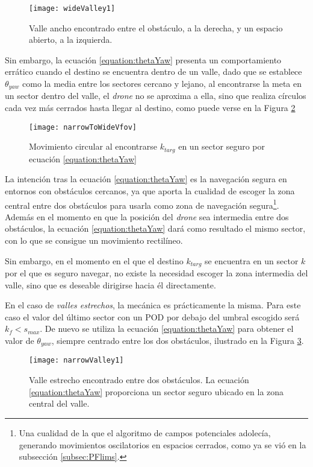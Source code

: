  \begin{figure}
	\centering
	\texttt{[image: wideValley1]}
	\caption[Valles estrechos y anchos.]{Valle ancho encontrado entre el obstáculo, a la derecha, y un espacio abierto, a la izquierda.}\label{fig:wvalley1}
\end{figure}


Sin embargo, la ecuación \ref{equation:thetaYaw} presenta un comportamiento errático cuando el destino se encuentra dentro de un valle, dado que se establece $\theta_{yaw}$ como la media entre los sectores cercano y lejano, al encontrarse la meta en un sector dentro del valle, el \emph{drone} no se aproxima a ella, sino que realiza círculos cada vez más cerrados hasta llegar al destino, como puede verse en la Figura \ref{fig:nToWFOV}

 \begin{figure}
	\centering
	\texttt{[image: narrowToWideVfov]}
	\caption[Movimiento circular del agente.]{Movimiento circular al encontrarse $k_{targ}$ en un sector seguro por ecuación \ref{equation:thetaYaw}}\label{fig:nToWFOV}
\end{figure}

La intención tras la ecuación \ref{equation:thetaYaw} es la navegación segura en entornos con obstáculos cercanos, ya que aporta la cualidad de escoger la zona central entre dos obstáculos para usarla como zona de navegación segura\footnote{Una cualidad de la que el algoritmo de campos potenciales adolecía, generando movimientos oscilatorios en espacios cerrados, como ya se vió en la subsección \ref{subsec:PFlims}.}. Además en el momento en que la posición del \emph{drone} sea intermedia entre dos obstáculos, la ecuación \ref{equation:thetaYaw} dará como resultado el mismo sector, con lo que se consigue un movimiento rectilíneo. 

Sin embargo, en el momento en el que el destino $k_\mathit{targ}$ se encuentra en un sector $k$ por el que es seguro navegar, no existe la necesidad escoger la zona intermedia del valle, sino que es deseable dirigirse hacia él directamente. 

En el caso de \textit{valles estrechos}, la mecánica es prácticamente la misma. Para este caso el valor del último sector con un POD por debajo del umbral escogido será $k_f < s_\mathit{max}$. De nuevo se utiliza la ecuación \ref{equation:thetaYaw} para obtener el valor de $\theta_\mathit{yaw}$, siempre centrado entre los dos obstáculos, ilustrado en la Figura \ref{fig:nvalley1}.
 \begin{figure}
	\centering
	\texttt{[image: narrowValley1]}
	\caption[Valle estrecho.]{Valle estrecho encontrado entre dos obstáculos. La ecuación \ref{equation:thetaYaw} proporciona un sector seguro ubicado en la zona central del valle.}\label{fig:nvalley1}
\end{figure}

